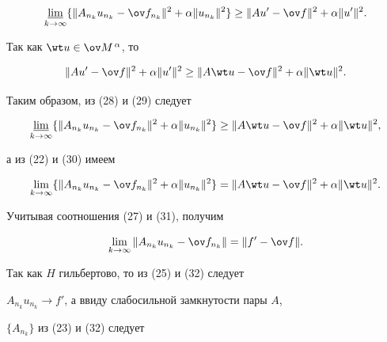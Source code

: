 \begin{pf}
\begin{equation} 


\underset{k\to\infty}{\varliminf}{}\{\|A_{n_k}u_{n_k}-\ov f_{n_k}\|^2+ 


\alpha\|u_{n_k}\|^2\}\ge \|Au'-\ov f\|^2+\alpha\|u'\|^2. 


\end{equation} 


Так как $\wt u\in\ov M^{\,\alpha}$, то 


\begin{equation} 


\|Au'-\ov f\|^2+\alpha\|u'\|^2\ge 


\|A\wt u-\ov f\|^2+\alpha\|\wt u\|^2. 


\end{equation} 


Таким образом, из (28) и (29) следует 


\begin{equation} 


\underset{k\to\infty}{\varliminf}{}\{\|A_{n_k}u_{n_k}-\ov f_{n_k}\|^2+ 


\alpha\|u_{n_k}\|^2\}\ge \|A\wt u-\ov f\|^2+\alpha\|\wt u\|^2, 


\end{equation} 


а из (22) и (30) имеем 


\begin{equation} 


\lim_{k\to\infty}\{\|A_{n_k}u_{n_k}-\ov f_{n_k}\|^2+ 


\alpha\|u_{n_k}\|^2\}=\|A\wt u-\ov f\|^2+\alpha\|\wt u\|^2. 


\end{equation} 


Учитывая соотношения (27) и (31), получим 


\begin{equation} 


\lim_{k\to\infty}\|A_{n_k}u_{n_k}-\ov f_{n_k}\|= 


\|f'-\ov f\|. 


\end{equation} 


Так как $H$ гильбертово, то из (25) и (32) следует 


$A_{n_k}u_{n_k}\to f'$, а ввиду слабосильной замкнутости пары $A$, 


$\{A_{n_k}\}$ из (23) и (32) следует 


\begin{equation} 



\end{equation}
\end{pf}
